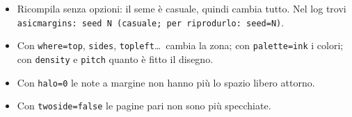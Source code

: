 \documentclass[11pt,twoside]{article}   %
\begin{document}
\begin{itemize}
  \item Ricompila senza opzioni: il seme è casuale, quindi cambia tutto. Nel log
        trovi \texttt{asicmargins: seed N (casuale; per riprodurlo: seed=N)}.
  \item Con \texttt{where=top}, \texttt{sides}, \texttt{topleft}\ldots\ cambia la zona;
        con \texttt{palette=ink} i colori; con \texttt{density} e \texttt{pitch}
        quanto è fitto il disegno.
  \item Con \texttt{halo=0} le note a margine non hanno più lo spazio libero attorno.
  \item Con \texttt{twoside=false} le pagine pari non sono più specchiate.
\end{itemize}

\lipsum[10-16]

\lipsum[17-22]
\end{document}
